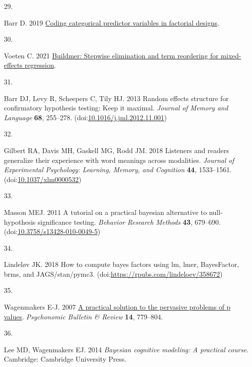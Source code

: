 \documentclass[
]{article}
\newlength{\cslhangindent}
\newlength{\csllabelwidth}
\newlength{\cslentryspacingunit} %
\newenvironment{CSLReferences}[2] %
 {%
  \setlength{\parindent}{0pt}
  \ifodd #1
  \let\oldpar\par
  \def\par{\hangindent=\cslhangindent\oldpar}
  \fi
  \setlength{\parskip}{#2\cslentryspacingunit}
 }%
 {}
\newcommand{\CSLLeftMargin}[1]{\parbox[t]{\csllabelwidth}{#1}}
\newcommand{\CSLRightInline}[1]{\parbox[t]{\linewidth - \csllabelwidth}{#1}\break}
\begin{document}
\begin{CSLReferences}{0}{0}
\leavevmode{}%
\CSLLeftMargin{29. }%
\CSLRightInline{Barr D. 2019 \href{https://talklab.psy.gla.ac.uk/tvw/catpred/}{Coding categorical predictor variables in factorial designs}. }

\leavevmode{}%
\CSLLeftMargin{30. }%
\CSLRightInline{Voeten C. 2021 \href{https://CRAN.R-project.org/package=buildmer}{Buildmer: Stepwise elimination and term reordering for mixed-effects regression}. }

\leavevmode{}%
\CSLLeftMargin{31. }%
\CSLRightInline{Barr DJ, Levy R, Scheepers C, Tily HJ. 2013 Random effects structure for confirmatory hypothesis testing: Keep it maximal. \emph{Journal of Memory and Language} \textbf{68}, 255--278. (doi:\href{https://doi.org/10.1016/j.jml.2012.11.001}{10.1016/j.jml.2012.11.001})}

\leavevmode{}%
\CSLLeftMargin{32. }%
\CSLRightInline{Gilbert RA, Davis MH, Gaskell MG, Rodd JM. 2018 Listeners and readers generalize their experience with word meanings across modalities. \emph{Journal of Experimental Psychology: Learning, Memory, and Cognition} \textbf{44}, 1533--1561. (doi:\href{https://doi.org/10.1037/xlm0000532}{10.1037/xlm0000532})}

\leavevmode{}%
\CSLLeftMargin{33. }%
\CSLRightInline{Masson MEJ. 2011 A tutorial on a practical bayesian alternative to null-hypothesis significance testing. \emph{Behavior Research Methods} \textbf{43}, 679--690. (doi:\href{https://doi.org/10.3758/s13428-010-0049-5}{10.3758/s13428-010-0049-5})}

\leavevmode{}%
\CSLLeftMargin{34. }%
\CSLRightInline{Lindeløv JK. 2018 How to compute bayes factors using lm, lmer, BayesFactor, brms, and JAGS/stan/pymc3. (doi:\url{https://rpubs.com/lindeloev/358672})}

\leavevmode{}%
\CSLLeftMargin{35. }%
\CSLRightInline{Wagenmakers E-J. 2007 \href{http://dx.doi}{A practical solution to the pervasive problems of p values}. \emph{Psychonomic Bulletin \& Review} \textbf{14}, 779--804.}

\leavevmode{}%
\CSLLeftMargin{36. }%
\CSLRightInline{Lee MD, Wagenmakers EJ. 2014 \emph{Bayesian cognitive modeling: A practical course}. Cambridge: Cambridge University Press. }


\end{CSLReferences}
\end{document}
